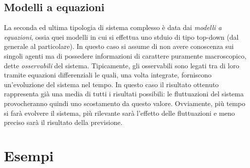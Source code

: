 \documentclass[12pt, a4paper]{book}
\theoremstyle{theorem}
\begin{document}
			\subsection{Modelli a equazioni}
				La seconda ed ultima tipologia di sistema complesso è data dai \emph{modelli a equazioni}, ossia quei modelli in cui si effettua uno stduio di tipo top-down (dal generale al particolare).
				In questo caso si assume di non avere conoscenza sui singoli agenti ma di possedere informazioni di carattere puramente macroscopico, dette \emph{osservabili} del sistema.
				Tipicamente, gli osservabili sono legati tra di loro tramite equazioni differenziali le quali, una volta integrate, forniscono un'evoluzione del sistema nel tempo.
				In questo caso il risultato ottenuto rappresenta già una media di tutti i risultati possibili: le fluttuazioni del sistema provocheranno quindi uno scostamento da questo valore.
				Ovviamente, più tempo si farà evolvere il sistema, più rilevante sarà l'effetto delle fluttuazioni e meno preciso sarà il risultato della previsione.

		\section{Esempi}
\end{document}
